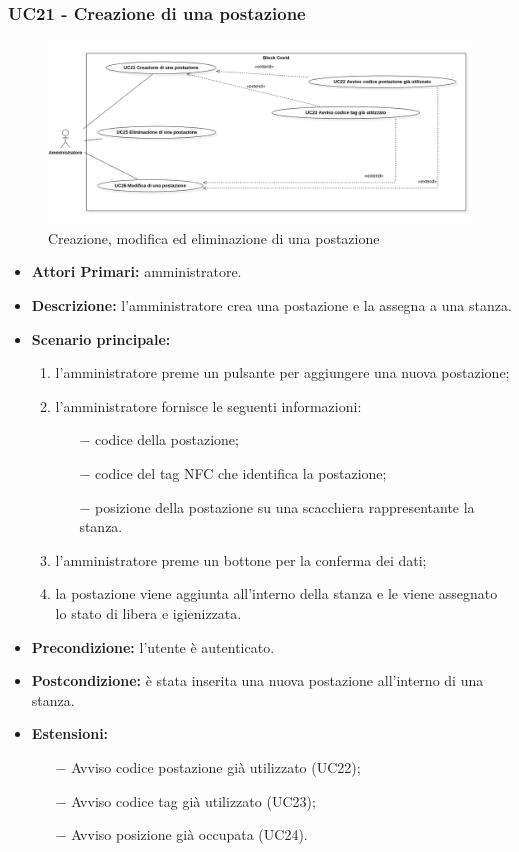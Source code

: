 \subsubsection{UC21 - Creazione di una postazione}
\begin{figure}[H]
	\centering
	\includegraphics[width=18cm]{res/images/UC21-22-23-25-26.png}
	\caption{Creazione, modifica ed eliminazione di una postazione}
\end{figure}
\begin{itemize}
	\item\textbf{Attori Primari:}
	amministratore.
	\item\textbf{Descrizione:}
	l'amministratore crea una postazione e la assegna a una stanza.
	\item\textbf{Scenario principale:} 
	\begin{enumerate}
		\item l'amministratore preme un pulsante per aggiungere una nuova postazione;
		\item l'amministratore fornisce le seguenti informazioni:
		\begin{itemize}
			\item[$-$] codice della postazione;
			\item[$-$] codice del tag NFC che identifica la postazione;
			\item[$-$] posizione della postazione su una scacchiera rappresentante la stanza.
		\end{itemize}
		\item l'amministratore preme un bottone per la conferma dei dati;
		\item la postazione viene aggiunta all'interno della stanza e le viene assegnato lo stato di libera e igienizzata.
	\end{enumerate}
	\item\textbf{Precondizione:} 
	l'utente è autenticato.
	\item\textbf{Postcondizione:}
	è stata inserita una nuova postazione all'interno di una stanza.
	\item\textbf{Estensioni:}
	\begin{itemize}
		\item[$-$] Avviso codice postazione già utilizzato (UC22);
		\item[$-$] Avviso codice tag già utilizzato (UC23);
		\item[$-$] Avviso posizione già occupata (UC24).
	\end{itemize}
\end{itemize}

